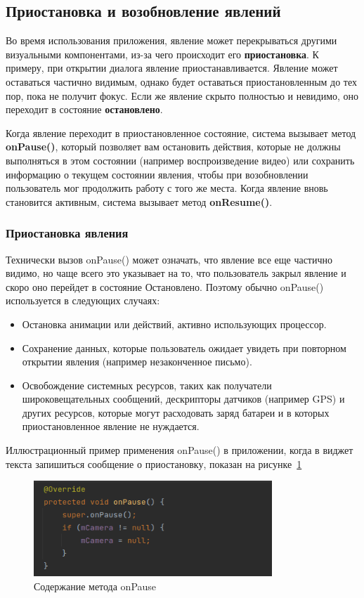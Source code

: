 \subsection{Приостановка и возобновление явлений}
Во время использования приложения, явление может перекрываться другими
визуальными компонентами, из-за чего происходит его \textbf{приостановка}. К
примеру, при открытии диалога явление приостанавливается. Явление может
оставаться частично видимым, однако будет оставаться приостановленным
до тех пор, пока не получит фокус. Если же явление скрыто полностью
и невидимо, оно переходит в состояние \textbf{остановлено}.\par
Когда явление переходит в приостановленное состояние, система вызывает
метод \textbf{onPause()}, который позволяет вам остановить действия, которые
не должны выполняться в этом состоянии (например воспроизведение видео)
или сохранить информацию о текущем состоянии явления, чтобы при
возобновлении пользователь мог продолжить работу с того же места. Когда
явление вновь становится активным, система вызывает метод \textbf{onResume()}.

\subsubsection{Приостановка явления}
Технически вызов onPause() может означать, что явление все еще частично
видимо, но чаще всего это указывает на то, что пользователь закрыл явление 
и скоро оно перейдет в состояние Остановлено. Поэтому обычно onPause()
используется в следующих случаях:
\begin{itemize}
	\item Остановка анимации или действий, активно использующих процессор.
	\item Сохранение данных, которые пользователь ожидает увидеть при
		повторном открытии явления (например незаконченное письмо).
	\item Освобождение системных ресурсов, таких как получатели
		широковещательных сообщений, дескрипторы датчиков (например GPS)
		и других ресурсов, которые могут расходовать заряд батареи
		и в которых приостановленное явление не нуждается.
\end{itemize}
Иллюстрационный пример применения onPause() в приложении,
когда в виджет текста запишиться сообщение о приостановку, показан
на рисунке~\ref{fig:activity:onPause:content}
\begin{figure}[h!tp]
	\centering
	\includegraphics[width=0.8\textwidth]{Screenshot from 2023-02-22 19-51-26.png}
	\caption{Содержание метода onPause}
	\label{fig:activity:onPause:content}
\end{figure}

